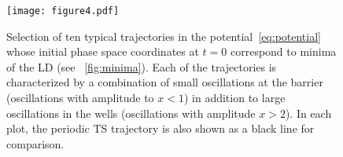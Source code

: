 \documentclass[aip,reprint,jcp,amsmath,amssymb,superscriptaddress,floatfix]{revtex4-1}
\begin{document}
\begin{figure}[t]
\centering
\texttt{[image: figure4.pdf]}
\caption{%
Selection of ten typical trajectories in the potential~\eqref{eq:potential} 
whose initial phase space coordinates at $t=0$ correspond to minima of the LD 
(see \FIG~\ref{fig:minima}).
Each of the trajectories is characterized by a combination of small 
oscillations at the barrier (oscillations with amplitude to $x<1$) in addition 
to large 
oscillations in the wells (oscillations with amplitude $x>2$).
In each plot, the periodic TS trajectory is also shown as a black line for 
comparison.
}
\label{fig:trajectories}
\end{figure}
\end{document}
